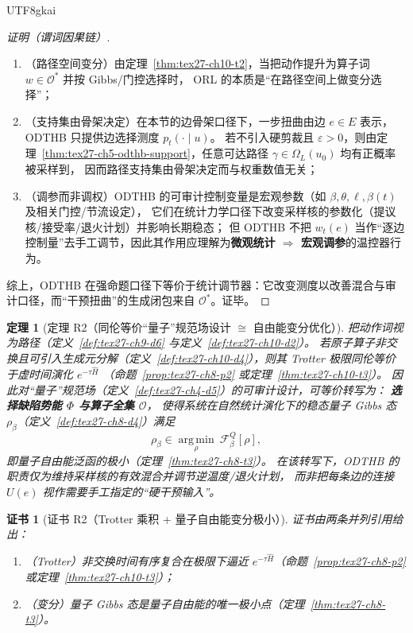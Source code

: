 \documentclass[12pt]{article}
\newtheorem{theorem}{定理}[section]
\newtheorem{Certificate}{证书}[section]
\begin{document}
\begin{CJK*}{UTF8}{gkai}
\begin{proof}[证明（谓词因果链）]
\begin{enumerate}
  \item（路径空间变分）由定理~\ref{thm:tex27-ch10-t2}，当把动作提升为算子词 $w\in\mathcal{O}^*$ 并按 Gibbs/门控选择时，
  ORL 的本质是“在路径空间上做变分选择”；
  \item（支持集由骨架决定）在本节的边骨架口径下，一步扭曲由边 $e\in E$ 表示，ODTHB 只提供边选择测度 $p_t(\cdot\mid u)$。
  若不引入硬剪裁且 $\varepsilon>0$，则由定理~\ref{thm:tex27-ch5-odthb-support}，任意可达路径 $\gamma\in\Omega_L(u_0)$ 均有正概率被采样到，
  因而路径支持集由骨架决定而与权重数值无关；
  \item（调参而非调权）ODTHB 的可审计控制变量是宏观参数（如 $\beta,\theta,\ell,\beta(t)$ 及相关门控/节流设定），
  它们在统计力学口径下改变采样核的参数化（提议核/接受率/退火计划）并影响长期稳态；
  但 ODTHB 不把 $w_t(e)$ 当作“逐边控制量”去手工调节，因此其作用应理解为\textbf{微观统计 $\Rightarrow$ 宏观调参}的温控器行为。
\end{enumerate}
综上，ODTHB 在强命题口径下等价于统计调节器：它改变测度以改善混合与审计口径，而“干预扭曲”的生成闭包来自 $\mathcal{O}^*$。证毕。
\end{proof}

\begin{theorem}[定理 R2（同伦等价“量子”规范场设计 $\cong$ 自由能变分优化）]
\label{thm:tex27-ch5-odthb-r2}
把动作词视为路径（定义~\ref{def:tex27-ch9-d6} 与定义~\ref{def:tex27-ch10-d2}）。
若原子算子非交换且可引入生成元分解（定义~\ref{def:tex27-ch10-d4}），则其 Trotter 极限同伦等价于虚时间演化 $e^{-\tau\widehat{H}}$
（命题~\ref{prop:tex27-ch8-p2} 或定理~\ref{thm:tex27-ch10-t3}）。
因此对“量子”规范场（定义~\ref{def:tex27-ch4-d5}）的可审计设计，可等价转写为：
\textbf{选择缺陷势能 $\Phi$ 与算子全集 $\mathcal{O}$}，
使得系统在自然统计演化下的稳态量子 Gibbs 态 $\rho_\beta$（定义~\ref{def:tex27-ch8-d4}）满足
\[
  \rho_\beta\in \operatorname*{arg\,min}_{\rho}\ \mathcal{F}^Q_\beta[\rho],
\]
即量子自由能泛函的极小（定理~\ref{thm:tex27-ch8-t3}）。
在该转写下，ODTHB 的职责仅为维持采样核的有效混合并调节逆温度/退火计划，
而非把每条边的连接 $U(e)$ 视作需要手工指定的“硬干预输入”。
\end{theorem}

\begin{Certificate}[证书 R2（Trotter 乘积 + 量子自由能变分极小）]
\label{cert:tex27-ch5-odthb-r2}
证书由两条并列引用给出：
\begin{enumerate}
  \item（Trotter）非交换时间有序复合在极限下逼近 $e^{-\tau\widehat{H}}$（命题~\ref{prop:tex27-ch8-p2} 或定理~\ref{thm:tex27-ch10-t3}）；
  \item（变分）量子 Gibbs 态是量子自由能的唯一极小点（定理~\ref{thm:tex27-ch8-t3}）。
\end{enumerate}
\end{Certificate}


\end{CJK*}
\end{document}
